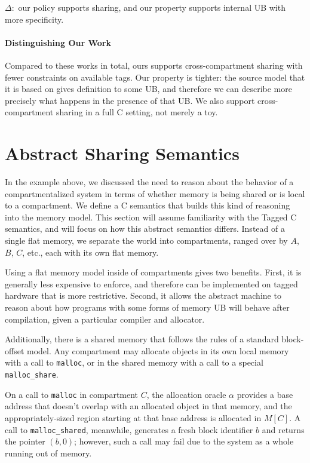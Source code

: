 \documentclass{article}
\begin{document}
\(\Delta:\) our policy supports sharing, and our property supports
internal UB with more specificity.

\paragraph{Distinguishing Our Work}

Compared to these works in total, ours supports cross-compartment sharing with fewer constraints
on available tags. Our property is tighter: the source model that it is based on gives definition
to some UB, and therefore we can describe more precisely what happens in the presence of that UB.
We also support cross-compartment sharing in a full C setting, not merely a toy.

\section{Abstract Sharing Semantics}

In the example above, we discussed the need to reason about the behavior of a compartmentalized
system in terms of whether memory is being shared or is local to a compartment.
We define a C semantics that builds this kind of reasoning into the memory model. This section
will assume familiarity with the Tagged C semantics, and will focus on how this abstract semantics
differs. Instead of a single flat memory, we separate the world
into compartments, ranged over by \(A\), \(B\), \(C\), etc., each with its own flat memory.

Using a flat memory model inside of compartments gives two benefits. First, it is generally
less expensive to enforce, and therefore can be implemented on tagged hardware that is more
restrictive. Second, it allows the abstract machine to reason about how programs with some
forms of memory UB will behave after compilation, given a particular compiler and allocator.

Additionally, there is a shared memory that follows the
rules of a standard block-offset model. Any compartment may allocate objects in its own
local memory with a call to {\tt malloc}, or in the shared memory with a call to a special
{\tt malloc\_share}.

On a call to {\tt malloc} in compartment \(C\), the allocation oracle \(\alpha\) provides a base
address that doesn't overlap with an allocated object in that memory, and the appropriately-sized
region starting at that base address is allocated in \(M[C]\).
A call to {\tt malloc\_shared}, meanwhile, generates a fresh block identifier \(b\)
and returns the pointer \((b,0)\); however, such a call may fail due to the system as a whole
running out of memory.
\end{document}
